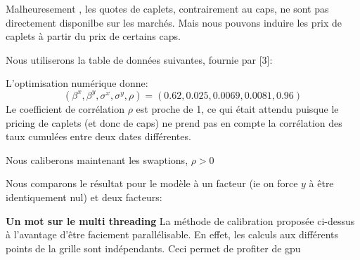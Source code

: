 Malheuresement , les quotes de caplets, contrairement au caps, ne sont pas directement disponilbe sur les marchés. Mais nous pouvons induire les prix de caplets à partir du prix de certains caps.

Nous utiliserons la table de données suivantes, fournie par [3]:



L'optimisation numérique donne:
$$ (\beta^x, \beta^y, \sigma^x, \sigma^y, \rho) = (0.62, 0.025, 0.0069, 0.0081, 0.96) $$
Le coefficient de corrélation $\rho$ est proche de 1, ce qui était attendu puisque le pricing de caplets (et donc de caps) ne prend pas en compte la corrélation des taux cumulées entre deux dates différentes.

Nous caliberons maintenant les swaptions, $\rho > 0$

Nous comparons le résultat pour le modèle à un facteur (ie on force $y$ à être identiquement nul) et deux facteurs:



\textbf{Un mot sur le multi threading}
La méthode de calibration proposée ci-dessus à l'avantage d'être faciement parallélisable. En effet, les calculs aux différents points de la grille sont indépendants. Ceci permet de profiter de gpu

